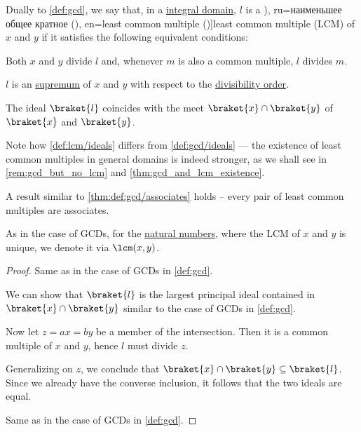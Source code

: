 \begin{definition}\label{def:lcm}
  Dually to \cref{def:gcd}, we say that, in a \hyperref[def:integral_domain]{integral domain}, \( l \) is a \term[bg=най-малко общо кратно (на числа) (\cite[381]{ГеновМиховскиМоллов1991Алгебра}), ru=наименьшее общее кратное (\cite[exerc. 3.6.3]{Винберг2014КурсАлгебры}), en=least common multiple (\cite[32]{Knapp2016BasicAlgebra})]{least common multiple} (LCM) of \( x \) and \( y \) if it satisfies the following equivalent conditions:

  \begin{thmenum}
     Both \( x \) and \( y \) divide \( l \) and, whenever \( m \) is also a common multiple, \( l \) divides \( m \).

     \( l \) is an \hyperref[def:extremal_points/supremum_and_infimum]{supremum} of \( x \) and \( y \) with respect to the \hyperref[thm:semiring_divisibility_order]{divisibility order}.

     The ideal \( \braket{ l } \) coincides with the meet \( \braket{ x } \cap \braket{ y } \) of \( \braket{ x } \) and \( \braket{ y } \).
  \end{thmenum}
\end{definition}
\begin{comments}
  \item Note how \cref{def:lcm/ideals} differs from \cref{def:gcd/ideals} --- the existence of least common multiples in general domains is indeed stronger, as we shall see in \cref{rem:gcd_but_no_lcm} and \cref{thm:gcd_and_lcm_existence}.

  \item A result similar to \cref{thm:def:gcd/associates} holds -- every pair of least common multiples are associates.

  \item As in the case of GCDs, for the \hyperref[def:natural_numbers]{natural numbers}, where the LCM of \( x \) and \( y \) is unique, we denote it via \( \lcm(x, y) \).
\end{comments}
\begin{proof}
   Same as in the case of GCDs in \cref{def:gcd}.

   We can show that \( \braket{ l } \) is the largest principal ideal contained in \( \braket{ x } \cap \braket{ y } \) similar to the case of GCDs in \cref{def:gcd}.

  Now let \( z = ax = by \) be a member of the intersection. Then it is a common multiple of \( x \) and \( y \), hence \( l \) must divide \( z \).

  Generalizing on \( z \), we conclude that \( \braket{ x } \cap \braket{ y } \subseteq \braket{ l } \). Since we already have the converse inclusion, it follows that the two ideals are equal.

   Same as in the case of GCDs in \cref{def:gcd}.
\end{proof}

